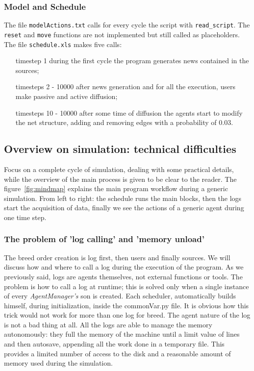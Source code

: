 \subsubsection{Model and Schedule}
The file \texttt{modelActions.txt} calls for every cycle the script with
\texttt{read\_script}.
The \texttt{reset} and \texttt{move} functions are not implemented
but still called as placeholders.
The file \texttt{schedule.xls} makes five calls:
\begin{itemize}
\item[timestep 1] during the first cycle the program generates news
  contained in the sources;
\item[timesteps 2 - 10000] after news generation and for all
  the execution, users make passive and active diffusion;
\item[timesteps 10 - 10000] after some time of diffusion the agents start
  to modify the net structure, adding and removing edges with a probability
  of 0.03.
\end{itemize}

\subsection{Overview on simulation: technical difficulties}
Focus on a complete cycle of simulation, dealing with some
practical details, while the overview of the main process is given to be
clear to the reader. The figure~\ref{fig:mindmap} explains the main program
workflow during a generic simulation.
From left to right: the schedule runs the main blocks, then the logs start
the acquisition of data, finally we see the actions of a generic agent
during one time step.

\subsubsection{The problem of 'log calling' and 'memory unload'}
The breed order creation is log first, then users and finally sources.
We will discuss how and where to call a log during the execution of the program.
As we previously said, logs are agents themselves, not external functions
or tools. The problem is how to call a log at runtime; this is solved
only when a single instance of every \textit{AgentManager's} son is
created. Each scheduler, automatically builds himself, during
initialization, inside the commonVar.py file. It is obvious how this trick
would not work for more than one log for breed.
The agent nature of the log is not a bad thing at all. All the logs are
able to manage the memory autonomously: they full the memory of the machine
until a limit value of lines and then autosave, appending all the work done
in a temporary file. This provides a limited number of access to the disk and
a reasonable amount of memory used during the simulation.

